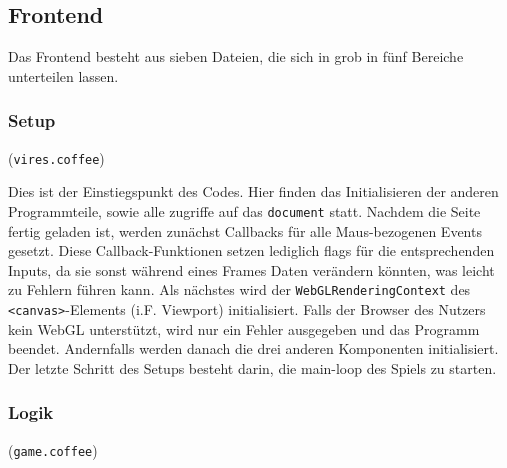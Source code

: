\subsection{Frontend}
Das Frontend besteht aus sieben Dateien, die sich in grob in fünf Bereiche unterteilen lassen.

\subsubsection{Setup} (\verb+vires.coffee+)

Dies ist der Einstiegspunkt des Codes. Hier finden das Initialisieren der anderen Programmteile, sowie alle zugriffe auf das \verb+document+ statt. 
Nachdem die Seite fertig geladen ist, werden zunächst Callbacks für alle Maus-bezogenen Events gesetzt. Diese Callback-Funktionen setzen lediglich flags für die entsprechenden Inputs, da sie sonst während eines Frames Daten verändern könnten, was leicht zu Fehlern führen kann.
Als nächstes wird der \verb+WebGLRenderingContext+ des \verb+<canvas>+-Elements (i.F. Viewport) initialisiert. Falls der Browser des Nutzers kein WebGL unterstützt, wird nur ein Fehler ausgegeben und das Programm beendet. Andernfalls werden danach die drei anderen Komponenten initialisiert.
Der letzte Schritt des Setups besteht darin, die main-loop des Spiels zu starten.

\subsubsection{Logik} (\verb+game.coffee+)

